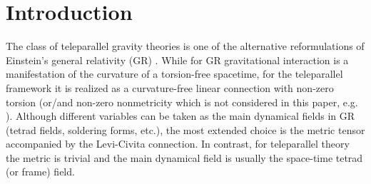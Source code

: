 \documentclass[
10pt, %
a4paper, %
oneside, %
twocolumn,
headinclude,footinclude, %
BCOR5mm, %
]{scrartcl}
\newcommand{\ho}[1]{\textcolor{magenta}{HO: #1}}
\begin{document}
	
	\setlength\parindent{10pt} %
	\setlength{\parskip}{5pt} %
	
	
	\section{Introduction}
	
	The class of teleparallel gravity theories is one of the alternative
	reformulations of Einstein's general relativity (GR)
	\cite{Hehl1976,AldrovandiPereiraBook,Cai2016}. While for GR gravitational
	interaction is a manifestation of the curvature of a torsion-free spacetime,
	for the teleparallel framework it is realized as a curvature-free linear
	connection with non-zero torsion (or/and non-zero nonmetricity which is not
	considered in this paper, e.g. \cite{Adak2006}). Although different variables can be taken as the
	main dynamical fields in GR (tetrad fields, soldering forms, etc.), the most
	extended choice is the metric tensor accompanied by the Levi-Civita
	connection. In contrast, for teleparallel theory the metric is trivial and
	the main dynamical field is usually the space-time tetrad (or frame) field.
	
\end{document}
